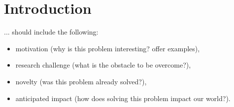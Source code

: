 \chapter{Introduction\label{cha:chapter1}}

... should include the following:
\begin{itemize}
\item motivation (why is this problem interesting? offer examples),
\item research challenge (what is the obstacle to be overcome?),
\item novelty (was this problem already solved?),
\item anticipated impact (how does solving this problem impact our world?).
\end{itemize}







